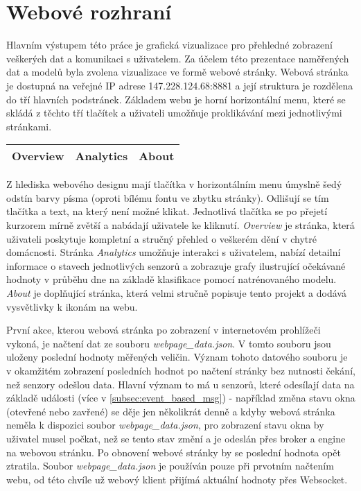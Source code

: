 \chapter{Webové rozhraní} \label{chap:web_page}

Hlavním výstupem této práce je grafická vizualizace pro přehledné zobrazení veškerých dat a komunikaci s uživatelem. Za účelem této prezentace naměřených dat a modelů byla zvolena vizualizace ve formě webové stránky. Webová stránka je dostupná na veřejné IP adrese 147.228.124.68:8881 a její struktura je rozdělena do tří hlavních podstránek. Základem webu je horní horizontální menu, které se skládá z těchto tří tlačítek a uživateli umožňuje proklikávání mezi jednotlivými stránkami.

\begin{table}[h!]
\centering
\begin{tabular}{|P{2.5cm}|P{2.5cm}|P{2.5cm}|} 
 \hline
 Overview & Analytics & About \\
 \hline
\end{tabular}
\end{table}

Z hlediska webového designu mají tlačítka v horizontálním menu úmyslně šedý odstín barvy písma (oproti bílému fontu ve zbytku stránky). Odlišují se tím tlačítka a text, na který není možné klikat. Jednotlivá tlačítka se po přejetí kurzorem mírně zvětší a nabádají uživatele ke kliknutí. \textit{Overview} je stránka, která uživateli poskytuje kompletní a stručný přehled o veškerém dění v chytré domácnosti. Stránka \textit{Analytics} umožňuje interakci s uživatelem, nabízí detailní informace o stavech jednotlivých senzorů a zobrazuje grafy ilustrující očekávané hodnoty v průběhu dne na základě klasifikace pomocí natrénovaného modelu. \textit{About} je doplňující stránka, která velmi stručně popisuje tento projekt a dodává vysvětlivky k ikonám na webu. \par
První akce, kterou webová stránka po zobrazení v internetovém prohlížeči vykoná, je načtení dat ze souboru \textit{webpage\_data.json}. V tomto souboru jsou uloženy poslední hodnoty měřených veličin. Význam tohoto datového souboru je v okamžitém zobrazení posledních hodnot po načtení stránky bez nutnosti čekání, než senzory odešlou data. Hlavní význam to má u senzorů, které odesílají data na základě události (více v \cref{subsec:event_based_msg}) - například změna stavu okna (otevřené nebo zavřené) se děje jen několikrát denně a kdyby webová stránka neměla k dispozici soubor \textit{webpage\_data.json}, pro zobrazení stavu okna by uživatel musel počkat, než se tento stav změní a je odeslán přes broker a engine na webovou stránku. Po obnovení webové stránky by se poslední hodnota opět ztratila. Soubor \textit{webpage\_data.json} je používán pouze při prvotním načtením webu, od této chvíle už webový klient přijímá aktuální hodnoty přes Websocket.  

